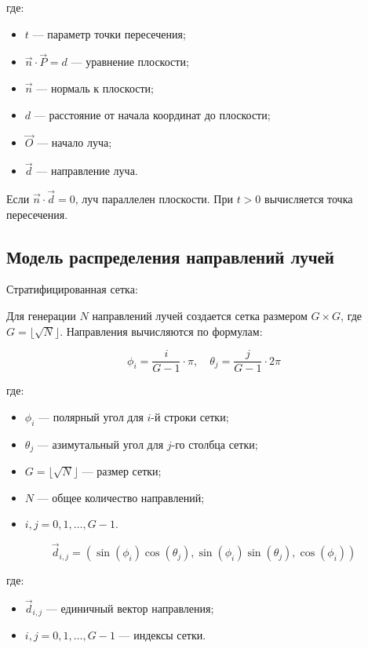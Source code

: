 где:
\begin{itemize}
    \item $t$ --- параметр точки пересечения;
    \item $\vec{n} \cdot \vec{P} = d$ --- уравнение плоскости;
    \item $\vec{n}$ --- нормаль к плоскости;
    \item $d$ --- расстояние от начала координат до плоскости;
    \item $\vec{O}$ --- начало луча;
    \item $\vec{d}$ --- направление луча.
\end{itemize}

Если $\vec{n} \cdot \vec{d} = 0$, луч параллелен плоскости. При $t > 0$ вычисляется точка пересечения.

\subsection{Модель распределения направлений лучей}

Стратифицированная сетка:

Для генерации $N$ направлений лучей создается сетка размером $G \times G$, где $G = \lfloor \sqrt{N} \rfloor$. Направления вычисляются по формулам:

\begin{equation}
\phi_i = \frac{i}{G-1} \cdot \pi, \quad \theta_j = \frac{j}{G-1} \cdot 2\pi
\end{equation}

где:
\begin{itemize}
    \item $\phi_i$ --- полярный угол для $i$-й строки сетки;
    \item $\theta_j$ --- азимутальный угол для $j$-го столбца сетки;
    \item $G = \lfloor \sqrt{N} \rfloor$ --- размер сетки;
    \item $N$ --- общее количество направлений;
    \item $i, j = 0, 1, \ldots, G-1$.
\end{itemize}

\begin{equation}
\vec{d}_{i,j} = (\sin(\phi_i) \cos(\theta_j), \sin(\phi_i) \sin(\theta_j), \cos(\phi_i))
\end{equation}

где:
\begin{itemize}
    \item $\vec{d}_{i,j}$ --- единичный вектор направления;
    \item $i, j = 0, 1, \ldots, G-1$ --- индексы сетки.
\end{itemize}

